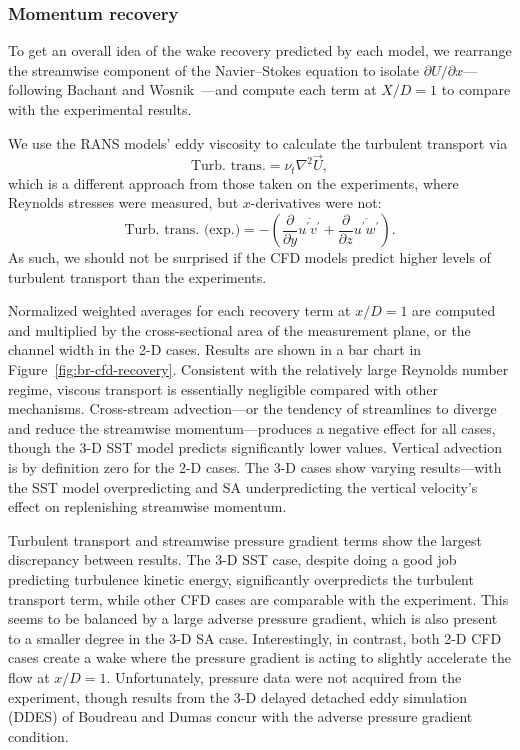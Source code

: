 \documentclass[aip,graphicx]{revtex4-1}
\begin{document}
\subsubsection{Momentum recovery}

To get an overall idea of the wake recovery predicted by each model, we
rearrange the streamwise component of the Navier--Stokes equation to isolate
$\partial U / \partial x$---following Bachant and
Wosnik~\cite{Bachant2015-JoT}---and compute each term at $X/D = 1$ to compare
with the experimental results.

We use the RANS models' eddy viscosity to calculate the turbulent transport via
\begin{equation}
    \text{Turb. trans.} = \nu_t \nabla^2 \vec{U},
    \label{eq:turb-trans}
\end{equation}
which is a different approach from those taken on the experiments, where
Reynolds stresses were measured, but $x$-derivatives were not:
\begin{equation}
    \text{Turb. trans. (exp.)} =
    -\left(
    \frac{\partial}{\partial y} \overline{u^\prime v^\prime}
    +
    \frac{\partial}{\partial z} \overline{u^\prime w^\prime}
    \right).
\end{equation}
As such, we should not be surprised if the CFD models predict higher levels of
turbulent transport than the experiments.

Normalized weighted averages for each recovery term at $x/D=1$ are computed and
multiplied by the cross-sectional area of the measurement plane, or the channel
width in the 2-D cases. Results are shown in a bar chart in
Figure~\ref{fig:br-cfd-recovery}. Consistent with the relatively large Reynolds
number regime, viscous transport is essentially negligible compared with other
mechanisms. Cross-stream advection---or the tendency of streamlines to diverge
and reduce the streamwise momentum---produces a negative effect for all cases,
though the 3-D SST model predicts significantly lower values. Vertical advection
is by definition zero for the 2-D cases. The 3-D cases show varying
results---with the SST model overpredicting and SA underpredicting the vertical
velocity's effect on replenishing streamwise momentum.

Turbulent transport and streamwise pressure gradient terms show the largest
discrepancy between results. The 3-D SST case, despite doing a good job
predicting turbulence kinetic energy, significantly overpredicts the turbulent
transport term, while other CFD cases are comparable with the experiment. This
seems to be balanced by a large adverse pressure gradient, which is also present
to a smaller degree in the 3-D SA case. Interestingly, in contrast, both 2-D CFD
cases create a wake where the pressure gradient is acting to slightly accelerate
the flow at $x/D=1$. Unfortunately, pressure data were not acquired from the
experiment, though results from the 3-D delayed detached eddy simulation (DDES)
of Boudreau and Dumas \cite{Boudreau2015} concur with the adverse pressure
gradient condition.
\end{document}

